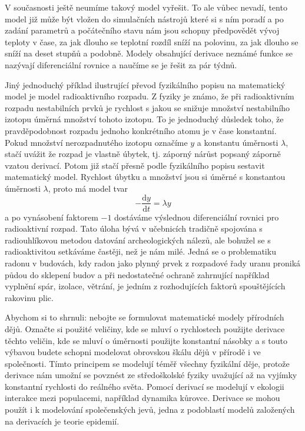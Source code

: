 \documentclass[12pt]{article}
\begin{document}
V současnosti ještě neumíme takový model vyřešit. To ale vůbec nevadí, tento model již může být vložen do simulačních nástrojů které si s ním poradí a po zadání parametrů a počátečního stavu nám jsou schopny předpovědět vývoj teploty v čase, za jak dlouho se teplotní rozdíl sníží na polovinu, za jak dlouho se sníží na deset stupňů a podobně. Modely obsahující derivace neznámé funkce se nazývají diferenciální rovnice a naučíme se je řešit za pár týdnů.

Jiný jednoduchý příklad ilustrující převod fyzikálního popisu na matematický model je model radioaktivního rozpadu. Z fyziky je známo, že při radioaktivním rozpadu nestabilních prvků je rychlost s jakou se snižuje množství nestabilního izotopu úměrná množství tohoto izotopu. To je jednoduchý důsledek toho, že pravděpodobnost rozpadu jednoho konkrétního atomu je v čase konstantní. Pokud množství nerozpadnutého izotopu označíme $y$ a konstantu úměrnosti $\lambda$, stačí uvážit že rozpad je vlastně úbytek, tj. záporný nárůst popsaný záporně vzatou derivací. Potom již stačí přesně podle fyzikálního popisu sestavit matematický model. Rychlost úbytku a množství jsou si úměrné s konstantou úměrnosti $\lambda$, proto má model tvar $$-\frac{\mathrm dy}{\mathrm dt}=\lambda y$$ a po vynásobení faktorem $-1$ dostáváme výslednou diferenciální rovnici pro radioaktivní rozpad. Tato úloha bývá v učebnicích tradičně spojována s radiouhlíkovou metodou datování archeologických nálezů, ale bohužel se s radioaktivitou setkáváme častěji, než je nám milé. Jedná se o problematiku radonu v budovách, kdy radon jako plynný prvek z rozpadové řady uranu proniká půdou do sklepení budov a při nedostatečné ochraně zahrnující například vyplnění spár, izolace, větrání, je jedním z rozhodujících faktorů spouštějících rakovinu plic.

Abychom si to shrnuli: nebojte se formulovat matematické modely přírodních dějů. Označte si použité veličiny, kde se mluví o rychlostech použijte derivace těchto veličin, kde se mluví o úměrnosti použijte konstantní násobky a s touto výbavou budete schopni modelovat obrovskou škálu dějů v přírodě i ve společnosti. Tímto principem se modelují téměř všechny fyzikální děje, protože derivace nám umožní se povznést ze středoškolské fyziky uvažující až na vyjímky konstantní rychlosti do reálného světa. Pomocí derivací se modelují v ekologii interakce mezi populacemi, například dynamika kůrovce. Derivace se mohou použít i k modelování společenských jevů, jedna z podoblastí modelů založených na derivacích je teorie epidemií.
\end{document}
